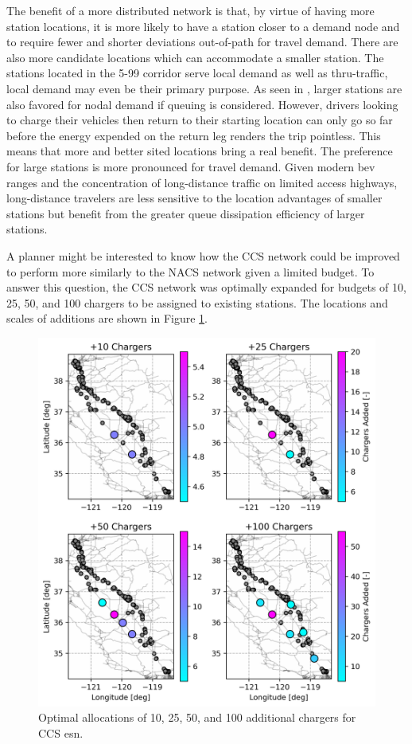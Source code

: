 The benefit of a more distributed network is that, by virtue of having more station locations, it is more likely to have a station closer to a demand node and to require fewer and shorter deviations out-of-path for travel demand. There are also more candidate locations which can accommodate a smaller station. The stations located in the 5-99 corridor serve local demand as well as thru-traffic, local demand may even be their primary purpose. As seen in \citep{Liu_2023}, larger stations are also favored for nodal demand if queuing is considered. However, drivers looking to charge their vehicles then return to their starting location can only go so far before the energy expended on the return leg renders the trip pointless. This means that more and better sited locations bring a real benefit. The preference for large stations is more pronounced for travel demand. Given modern \gls{bev} ranges and the concentration of long-distance traffic on limited access highways, long-distance travelers are less sensitive to the location advantages of smaller stations but benefit from the greater queue dissipation efficiency of larger stations.

A planner might be interested to know how the CCS network could be improved to perform more similarly to the NACS network given a limited budget. To answer this question, the CCS network was optimally expanded for budgets of 10, 25, 50, and 100 chargers to be assigned to existing stations. The locations and scales of additions are shown in Figure \ref{fig:augmented_esns}.

\begin{figure}[H]
	\centering
	\includegraphics[width = \linewidth]{./figures/augmented_esns.png}
	\caption{Optimal allocations of 10, 25, 50, and 100 additional chargers for CCS \gls{esn}.}
	\label{fig:augmented_esns}
\end{figure}


